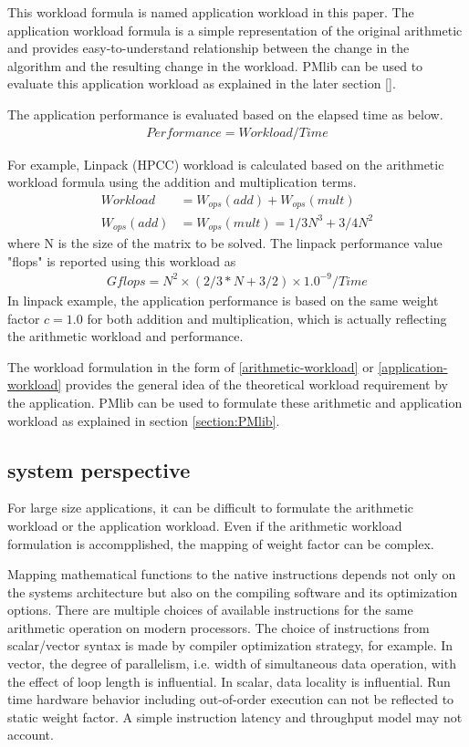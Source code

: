 \documentclass[conference]{IEEEtran}
\begin{document}
This workload formula is named application workload in this paper.
The application workload formula is a simple representation of the original
arithmetic and provides easy-to-understand relationship between the change
in the algorithm and the resulting change in the workload.
PMlib can be used to evaluate this application workload as explained
in the later section \ref{}.

The application performance is evaluated based on the elapsed time as below.
\begin{align}\label{eq:performance-workload-time}
Performance = Workload / Time 
\end{align}

For example, Linpack (HPCC) 
\cite{}
workload is calculated based on the arithmetic workload formula
using the addition and multiplication terms.
\begin{align}
		Workload & = W_{ops}(add) + W_{ops}(mult) \\
		W_{ops}(add) & = W_{ops}(mult) = 1/3 N^{3} + 3/4 N^{2}
\end{align}
where N is the size of the matrix to be solved.
The linpack performance value "flops" is reported using this workload as
\begin{align*}
Gflops = N^{2} \times ( 2/3 * N + 3/2 ) \times 1.0^{-9} / Time 
\end{align*}
In linpack example, the application performance is based on
the same weight factor $ c = 1.0 $ 
for both addition and multiplication, which is actually reflecting the
arithmetic workload and performance.

The workload formulation in the form of
\eqref{arithmetic-workload}
or
\eqref{application-workload}
provides the general idea of the theoretical workload requirement by the
application.
PMlib can be used to formulate these arithmetic and application workload
as explained in section \ref{section:PMlib}.


\subsection{system perspective}
\label{subsection:system-perspective}

For large size applications, it can be difficult to formulate
the arithmetic workload or the application workload.
Even if the arithmetic workload formulation is accompplished,
the mapping of weight factor can be complex.

Mapping mathematical functions to the native instructions
depends not only on the systems architecture but also on the compiling
software and its optimization options.
There are multiple choices of available instructions for the same
arithmetic operation on modern processors.
The choice of instructions from scalar/vector syntax is made by
compiler optimization strategy, for example.
In vector, the degree of parallelism, i.e. width of simultaneous data
operation, with the effect of loop length is influential.
In scalar, data locality is influential.
Run time hardware behavior including out-of-order execution can not
be reflected to static weight factor.
A simple instruction latency and throughput model may not account.
\end{document}
